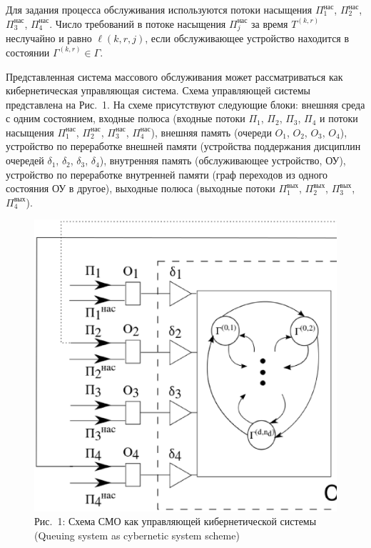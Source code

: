 \documentclass[12pt]{book}
\theoremstyle{plain}
\theoremstyle{remark}
\theoremstyle{plain}
\theoremstyle{definition}
\begin{document}
Для задания процесса обслуживания используются потоки насыщения
$\Pi^{\mathrm{\text{нас}}}_1$, $\Pi^{\mathrm{\text{нас}}}_2$, $\Pi^{\mathrm{\text{нас}}}_3$,
$\Pi^{\mathrm{\text{нас}}}_4$.  Число требований в потоке насыщения
$\Pi^{\mathrm{\text{нас}}}_j$ за время $T^{(k,r)}$ неслучайно и равно $\ell(k,r,j)$, если
обслуживающее устройство находится в состоянии $\Gamma^{(k,r)}\in \Gamma$.

Представленная система массового обслуживания может рассматриваться как
кибернетическая управляющая система.  Схема управляющей системы
представлена на Рис.~1. На схеме присутствуют следующие блоки: внешняя среда с
одним состоянием, входные полюса (входные потоки $\Pi_1$, $\Pi_2$, $\Pi_3$,
$\Pi_4$ и потоки насыщения $\Pi^{\mathrm{\text{нас}}}_1$, $\Pi^{\mathrm{\text{нас}}}_2$, $\Pi^{\mathrm{\text{нас}}}_3$,
$\Pi^{\mathrm{\text{нас}}}_4$), внешняя память (очереди $O_1$, $O_2$, $O_3$, $O_4$), устройство по
переработке внешней памяти (устройства поддержания дисциплин очередей
$\delta_1$, $\delta_2$, $\delta_3$, $\delta_4$), внутренняя память (обслуживающее
устройство, ОУ), устройство по переработке внутренней памяти (граф переходов из
одного состояния ОУ в другое), выходные полюса (выходные потоки
$\Pi^{\mathrm{\text{вых}}}_1$, $\Pi^{\mathrm{\text{вых}}}_2$,
$\Pi^{\mathrm{\text{вых}}}_3$, $\Pi^{\mathrm{\text{вых}}}_4$).
\sloppy 

\begin{figure}[h!]
   \centering
    \includegraphics[width=17cm]{SystemScheme.eps}
    \caption {Рис.~1: Схема СМО как управляющей кибернетической системы ({Queuing system as cybernetic system scheme})}
\end{figure}
\end{document}
